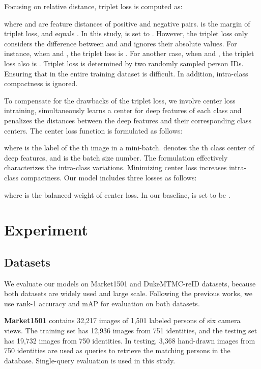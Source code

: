 \documentclass[journal]{IEEEtran}
\begin{document}
Focusing on relative distance, triplet loss is computed as:

where  and  are feature distances of positive and negative pairs.
 is the margin of triplet loss, and  equals .
In this study,  is set to .
However, the triplet loss only considers the difference between  and  and ignores their absolute values.
For instance, when  and , the triplet loss is .
For another case, when  and , the triplet loss also is .
Triplet loss is determined by two randomly sampled person IDs. Ensuring that  in the entire training dataset is difficult. In addition, intra-class compactness is ignored.

To compensate for the drawbacks of the triplet loss, we involve center loss \cite{wen2016discriminative} intraining, simultaneously learns a center for deep features of each class and penalizes the distances between the deep features and their corresponding class centers. The center loss function is formulated as follows:

where  is the label of the th image in a mini-batch.
 denotes the th class center of deep features, and  is the batch size number. The formulation effectively characterizes the intra-class variations. Minimizing center loss increases intra-class compactness. Our model includes three losses as follows:

where  is the balanced weight of center loss.
In our baseline,  is set to be .


\section{Experiment}

\subsection{Datasets}
We evaluate our models on Market1501 \cite{zheng2015scalable} and DukeMTMC-reID \cite{ristani2016MTMC} datasets, because both datasets are widely used and large scale.
Following the previous works, we use rank-1 accuracy and mAP for evaluation on both datasets.

\textbf{Market1501} contains 32,217 images of 1,501 labeled persons of six camera views. The training set has 12,936 images from 751 identities, and the testing set has 19,732 images from 750 identities. In testing, 3,368 hand-drawn images from 750 identities are used as queries to retrieve the matching persons in the database. Single-query evaluation is used in this study.
\end{document}
